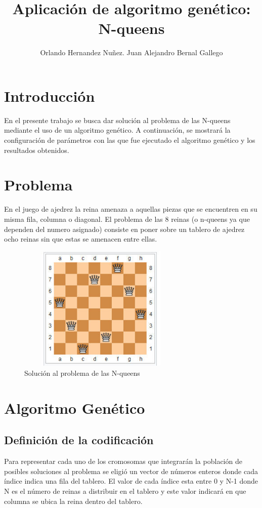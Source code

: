 \documentclass[11pt]{article}
\begin{document}
\title{Aplicaci\'on de algoritmo gen\'etico: N-queens }
\author{Orlando Hernandez Nu\~nez. Juan Alejandro Bernal Gallego}
\maketitle

\section{Introducci\'on}
En el presente trabajo se busca dar soluci\'on al problema de las N-queens mediante el uso de un algoritmo gen\'etico. A continuaci\'on, se mostrar\'a la configuraci\'on de par\'ametros con las que fue ejecutado el algoritmo gen\'etico y los resultados obtenidos.

\section{Problema}
En el juego de ajedrez la reina amenaza a aquellas piezas que se encuentren en su misma fila, columna o diagonal. El problema de las 8 reinas (o n-queens ya que dependen del numero asignado) consiste en poner sobre un tablero de ajedrez ocho reinas sin que estas se amenacen entre ellas.
\begin{figure}[h]
\includegraphics[width=8cm, height=6cm]{nqueens}
\centering
\caption{Soluci\'on al problema de las N-queens}
\end{figure}
\section{Algoritmo Gen\'etico}
\subsection{Definici\'on de la codificaci\'on}
Para representar cada uno de los cromosomas que integrar\'an la poblaci\'on de posibles soluciones
al problema se eligi\'o un vector de n\'umeros enteros donde cada \'indice indica una fila del tablero.
El valor de cada \'indice esta entre 0 y N-1 donde N es el n\'umero de reinas a distribuir en el tablero
y este valor indicar\'a en que columna se ubica la reina dentro del tablero.
\end{document}
